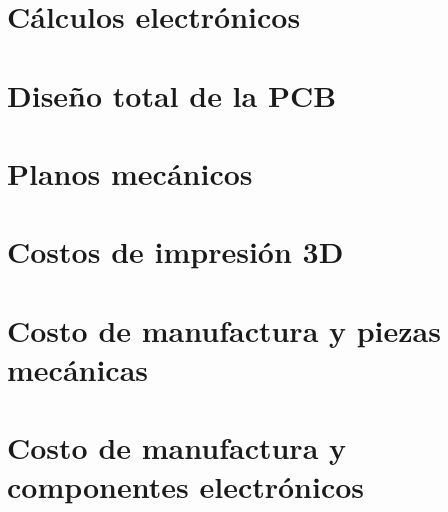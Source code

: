 \chapter{Cálculos electrónicos}
\label{an:Anexo_u}

\cleardoublepage
\chapter{Diseño total de la \ac{PCB}}
\label{an:Anexo_T}

\cleardoublepage
\chapter{Planos mecánicos}
\label{an:Anexo_S}

\cleardoublepage
\chapter{Costos de impresión 3D}
\label{an:Anexo_H}

 \cleardoublepage
 \chapter{Costo de manufactura y piezas mecánicas}
 \label{an:Anexo_R}

 \cleardoublepage
 \chapter{Costo de manufactura y componentes electrónicos}
 \label{an:Anexo_Z}

 \cleardoublepage